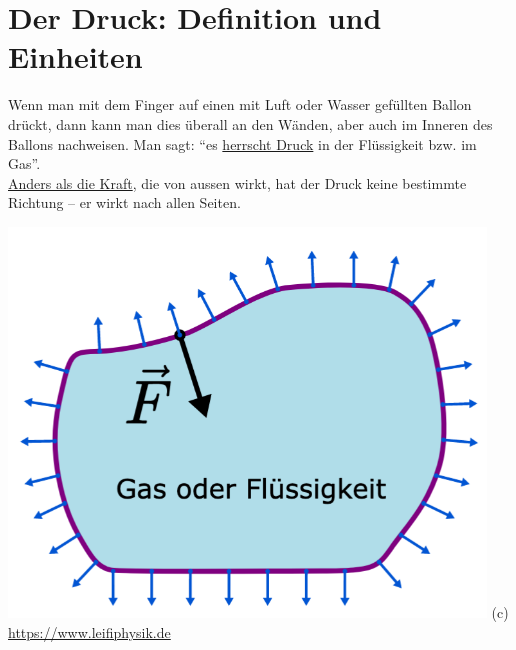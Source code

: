 \documentclass[11pt]{article}
\begin{document}
\newpage

\section*{Der Druck: Definition und Einheiten}

\vspace{-0.5cm}
\begin{minipage}{0.65\textwidth}
Wenn man mit dem Finger auf einen mit Luft oder Wasser gefüllten Ballon drückt, dann kann man dies überall an den Wänden, aber auch im Inneren des Ballons nachweisen. Man sagt: ``es \underline{herrscht Druck} in der Flüssigkeit bzw. im Gas''. \\

\underline{Anders als die Kraft}, die von aussen wirkt, hat der Druck keine bestimmte Richtung – er wirkt nach allen Seiten.
\end{minipage}
\begin{minipage}{0.33\textwidth}
    \begin{flushright}
        \includegraphics[width=0.95\textwidth]{images/Druck_01.png}
        {\scriptsize (c) \url{https://www.leifiphysik.de}}
    \end{flushright}
\end{minipage}


\end{document}
